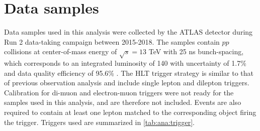 \documentclass[../thesis.tex]{subfiles}
\begin{document}
\vspace{-1\baselineskip}

\section{Data samples}
\label{sec:data}
Data samples used in this analysis were collected by the \acs{ATLAS} detector during Run 2 data-taking campaign between 2015-2018. The samples contain $pp$ collisions at center-of-mass energy of $\sqrt{s}=13$ TeV with 25 ns bunch-spacing, which corresponds to an integrated luminosity of 140 \fb with uncertainty of 1.7\% and data quality efficiency of 95.6\% \citep{sample:data}. The \acs{HLT} trigger strategy is similar to that of previous \tttt observation analysis \citep{tttt_obs} and include single lepton and dilepton triggers. Calibration for di-muon and electron-muon triggers were not ready for the samples used in this analysis, and are therefore not included. Events are also required to contain at least one lepton matched to the corresponding object firing the trigger. Triggers used are summarized in \autoref{tab:ana:trigger}.
\end{document}
